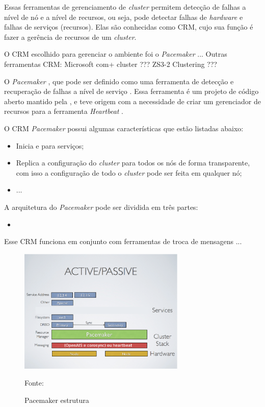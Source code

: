 Essas ferramentas de gerenciamento de \textit{cluster} permitem detecção de falhas a nível de nó e a nível de recursos, ou seja, pode detectar
falhas de \textit{hardware} e falhas de serviços (recursos).
Elas são conhecidas como \ac{CRM}, cujo sua função é fazer a gerência de recursos de um \textit{cluster}.

O \ac{CRM} escolhido para gerenciar o ambiente foi o \textit{Pacemaker} ...
Outras ferramentas CRM:
Microsoft com+ cluster ???
ZS3-2 Clustering ???

O \textit{Pacemaker} \cite{pacemaker}, que pode ser definido como uma ferramenta de detecção e recuperação de falhas a nível de 
serviço \cite{perkov2011}. Essa ferramenta é um projeto de código aberto mantido pela \cite{clusterlabs}, e teve origem com a necessidade de 
criar um gerenciador de recursos para a ferramenta \textit{Heartbeat} \cite{heartbeat}. 

O \ac{CRM} \textit{Pacemaker} possui algumas características que estão listadas abaixo:
\begin{itemize}
 \item Inicia e para serviços;
 \item Replica a configuração do \textit{cluster} para todos os nós de forma transparente, com isso a configuração de todo o \textit{cluster} pode ser feita em qualquer nó;
 \item ...
\end{itemize}

A arquitetura do \textit{Pacemaker} pode ser dividida em três partes:
\begin{itemize}
 \item 
\end{itemize}

Esse \ac{CRM} funciona em conjunto com ferramentas de troca de mensagens ...

\begin{figure}[h!]
 \centering
 \includegraphics[width=300px]{img/pacemaker_tools.eps}
 \caption{Pacemaker estrutura}
 Fonte: \citet{pacemaker}
 \label{fig:pacemaker_tools}
\end{figure}

